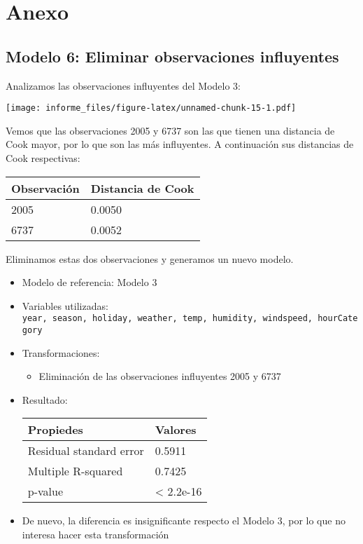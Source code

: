 \documentclass[
]{article}
\providecommand{\tightlist}{%
  \setlength{\itemsep}{0pt}\setlength{\parskip}{0pt}}
\begin{document}
\newpage

\hypertarget{anexo}{%
\section{Anexo}\label{anexo}}

\hypertarget{modelo-6-eliminar-observaciones-influyentes}{%
\subsection{Modelo 6: Eliminar observaciones
influyentes}\label{modelo-6-eliminar-observaciones-influyentes}}

Analizamos las observaciones influyentes del Modelo 3:

\texttt{[image: informe\_files/figure-latex/unnamed-chunk-15-1.pdf]}

Vemos que las observaciones 2005 y 6737 son las que tienen una distancia
de Cook mayor, por lo que son las más influyentes. A continuación sus
distancias de Cook respectivas:

\begin{longtable}[]{@{}ll@{}}
\toprule
Observación & Distancia de Cook\tabularnewline
\midrule
\endhead
2005 & 0.0050\tabularnewline
6737 & 0.0052\tabularnewline
\bottomrule
\end{longtable}

Eliminamos estas dos observaciones y generamos un nuevo modelo.

\begin{itemize}
\item
  Modelo de referencia: Modelo 3
\item
  Variables utilizadas:
  \texttt{year,\ season,\ holiday,\ weather,\ temp,\ humidity,\ windspeed,\ hourCategory}
\item
  Transformaciones:

  \begin{itemize}
  \tightlist
  \item
    Eliminación de las observaciones influyentes 2005 y 6737
  \end{itemize}
\item
  Resultado:

  \begin{longtable}[]{@{}ll@{}}
  \toprule
  Propiedes & Valores\tabularnewline
  \midrule
  \endhead
  Residual standard error & 0.5911\tabularnewline
  Multiple R-squared & 0.7425\tabularnewline
  p-value & \textless{} 2.2e-16\tabularnewline
  \bottomrule
  \end{longtable}
\item
  De nuevo, la diferencia es insignificante respecto el Modelo 3, por lo
  que no interesa hacer esta transformación
\end{itemize}
\end{document}
